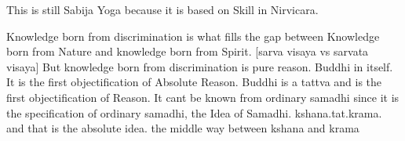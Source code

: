 This is still Sabija Yoga because it is based on
Skill in Nirvicara. 

Knowledge born from discrimination is what 
fills the gap between Knowledge born from Nature
and knowledge born from Spirit.
[sarva visaya vs sarvata visaya]
But knowledge born from discrimination is pure reason.
Buddhi in itself. It is the first objectification
of Absolute Reason. Buddhi is a tattva and is the
first objectification of Reason. It cant be
known from ordinary samadhi since it is the specification of
ordinary samadhi, the Idea of Samadhi. kshana.tat.krama.
and that is the absolute idea. the middle way between 
kshana and krama